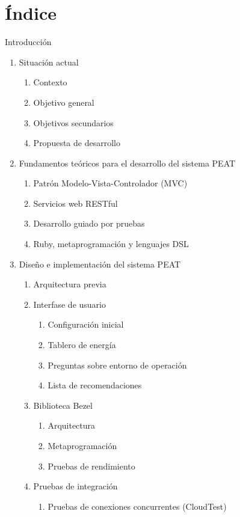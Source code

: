 \documentclass{article}
\begin{document}
\section{Índice}
Introducción
\begin{enumerate}
\item Situación actual
  \begin{enumerate}[label*=\arabic*.]
  \item{Contexto}
  \item{Objetivo general}
  \item{Objetivos secundarios}
  \item{Propuesta de desarrollo}
  \end{enumerate}
\item Fundamentos teóricos para el desarrollo del sistema PEAT
  \begin{enumerate}[label*=\arabic*.]
  \item{Patrón Modelo-Vista-Controlador (MVC)}
  \item{Servicios web RESTful}
  \item{Desarrollo guiado por pruebas}
  \item{Ruby, metaprogramación y lenguajes DSL}
  \end{enumerate}
\item Diseño e implementación del sistema PEAT
  \begin{enumerate}[label*=\arabic*.]
  \item Arquitectura previa
  \item Interfase de usuario
    \begin{enumerate}[label*=\arabic*.]
    \item Configuración inicial
    \item Tablero de energía
    \item Preguntas sobre entorno de operación
    \item Lista de recomendaciones
    \end{enumerate}
  \item Biblioteca Bezel
    \begin{enumerate}[label*=\arabic*.]
    \item Arquitectura
    \item Metaprogramación
    \item Pruebas de rendimiento
    \end{enumerate}
  \item Pruebas de integración
    \begin{enumerate}[label*=\arabic*.]
    \item Pruebas de conexiones concurrentes (CloudTest)

\end{enumerate}
\end{enumerate}
\end{enumerate}
\end{document}
